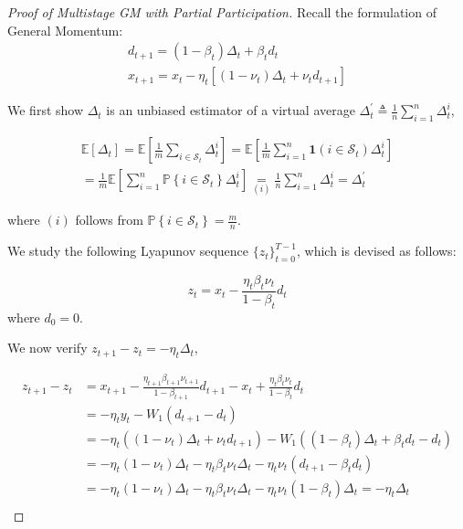 \begin{proof}[Proof of Multistage GM with Partial Participation]

Recall the formulation of General Momentum:
\begin{equation}
    \begin{gathered}
    d_{t+1}=(1-\beta_t)\Delta_t+\beta_t d_t\\
    x_{t+1}=x_t-\eta_t[(1-\nu_t)\Delta_t+\nu_t d_{t+1}]
\end{gathered}\nonumber
\end{equation}

We first show $\Delta_t$ is an unbiased estimator of a virtual average $\Delta^\prime_t \triangleq \frac{1}{n}\sum_{i=1}^n\Delta_t^i$,

\begin{equation}
\begin{gathered}
\mathbb{E}\left[\Delta_t\right] = \mathbb{E}\left[ \frac{1}{m}\sum_{i\in\mathcal{S}_t}  \Delta_t^i  \right] = \mathbb{E}\left[ \frac{1}{m} \sum_{i=1}^n \mathbf{1}\left( i\in\mathcal{S}_t \right) \Delta_t^i  \right]  \\
= \frac{1}{m} \mathbb{E}\left[ \sum_{i=1}^n \mathbb{P}\left\{i\in\mathcal{S}_t\right\} \Delta_t^i  \right] \underset{(i)}{=} \frac{1}{n}\sum_{i=1}^n\Delta_t^i=\Delta^\prime_t
\end{gathered}\nonumber
\end{equation}

where $(i)$ follows from $\mathbb{P}\left\{i\in\mathcal{S}_t\right\}=\frac{m}{n}$.

We study the following Lyapunov sequence $\{z_t\}_{t=0}^{T-1}$, which is devised as follows:

\begin{equation}
\label{auxiliary_seq}
z_t= x_t-\frac{\eta_t\beta_t\nu_t}{1-\beta_t}d_{t}
\end{equation}
where $d_{0}=0$.

We now verify $z_{t+1}-z_t= - \eta_t \Delta_t$,

\begin{align*}
z_{t+1}-z_t&=x_{t+1}-\frac{\eta_{t+1}\beta_{t+1}\nu_{t+1}}{1-\beta_{t+1}} d_{t+1} - x_{t}+\frac{\eta_{t}\beta_{t}\nu_{t}}{1-\beta_{t}} d_{t}\\
&=-\eta_t y_t-W_1(d_{t+1}-d_t)\\
&=-\eta_t((1-\nu_t)\Delta_t+\nu_t d_{t+1})-W_1((1-\beta_t)\Delta_t+\beta_t d_t-d_t)\\
&=-\eta_t(1-\nu_t)\Delta_t-\eta_t\beta_t\nu_t\Delta_t-\eta_t\nu_t(d_{t+1}-\beta_t d_t)\\
&=-\eta_t(1-\nu_t)\Delta_t-\eta_t\beta_t\nu_t\Delta_t-\eta_t\nu_t(1-\beta_t)\Delta_t=-\eta_t\Delta_t\\
\end{align*}



\end{proof}
